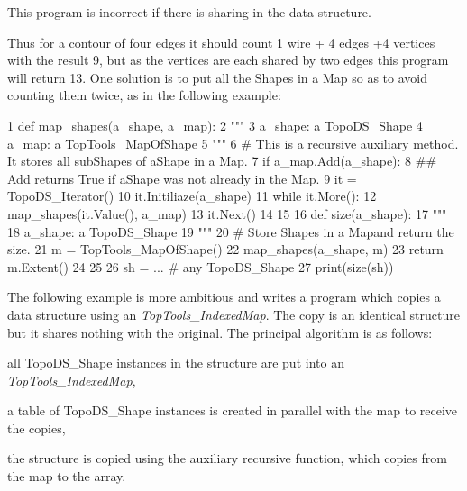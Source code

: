 This program is incorrect if there is sharing in the data structure.

Thus for a contour of four edges it should count 1 wire + 4 edges +4 vertices with the result 9, but as the vertices are each shared by two edges this program will return 13. One solution is to put all the Shapes in a Map so as to avoid counting them twice, as in the following example\+:


\begin{DoxyCode}
1 \textcolor{keyword}{def }map\_shapes(a\_shape, a\_map):
2  \textcolor{stringliteral}{"""}
3 \textcolor{stringliteral}{ a\_shape: a TopoDS\_Shape}
4 \textcolor{stringliteral}{ a\_map: a TopTools\_MapOfShape}
5 \textcolor{stringliteral}{ """}
6  \textcolor{comment}{# This is a recursive auxiliary method. It stores all subShapes of aShape in a Map.}
7  \textcolor{keywordflow}{if} a\_map.Add(a\_shape):
8    \textcolor{comment}{## Add returns True if aShape was not already in the Map. }
9    it = TopoDS\_Iterator()
10    it.Initiliaze(a\_shape)
11    \textcolor{keywordflow}{while} it.More():
12      map\_shapes(it.Value(), a\_map)
13      it.Next()
14 
15 
16 \textcolor{keyword}{def }size(a\_shape):
17   \textcolor{stringliteral}{"""}
18 \textcolor{stringliteral}{  a\_shape: a TopoDS\_Shape}
19 \textcolor{stringliteral}{  """}
20   \textcolor{comment}{# Store Shapes in a Mapand return the size. }
21   m = TopTools\_MapOfShape()
22   map\_shapes(a\_shape, m)
23   \textcolor{keywordflow}{return} m.Extent()
24 
25 
26 sh = ... \textcolor{comment}{# any TopoDS\_Shape}
27 print(size(sh))
\end{DoxyCode}


The following example is more ambitious and writes a program which copies a data structure using an {\itshape Top\+Tools\+\_\+\+Indexed\+Map}. The copy is an identical structure but it shares nothing with the original. The principal algorithm is as follows\+:
\begin{DoxyItemize}
\item all Topo\+D\+S\+\_\+\+Shape instances in the structure are put into an {\itshape Top\+Tools\+\_\+\+Indexed\+Map},
\item a table of Topo\+D\+S\+\_\+\+Shape instances is created in parallel with the map to receive the copies,
\item the structure is copied using the auxiliary recursive function, which copies from the map to the array.
\end{DoxyItemize}


